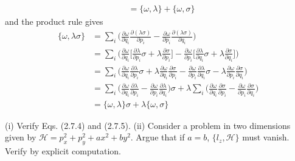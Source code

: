 \documentclass[../principles-of-quantum-mechanics.tex]{subfiles}
\begin{document}
\begin{questions}
\begin{solution}
\begin{align*}
				&= \{\omega, \lambda\} + \{\omega, \sigma\}
			\end{align*}
			and the product rule gives
			\begin{align*}
				\{\omega, \lambda\sigma\} &= \sum_i\Big(\frac{\partial\omega}{\partial q_i}\frac{\partial(\lambda\sigma)}{\partial p_i} - \frac{\partial\omega}{\partial p_i}\frac{\partial(\lambda\sigma)}{\partial q_i}\Big) \\
				&= \sum_i\Big(\frac{\partial\omega}{\partial q_i}\Big[\frac{\partial\lambda}{\partial p_i}\sigma + \lambda\frac{\partial\sigma}{\partial p_i}\Big] - \frac{\partial\omega}{\partial p_i}\Big[\frac{\partial\lambda}{\partial q_i}\sigma + \lambda\frac{\partial\sigma}{\partial q_i}\Big]\Big) \\
				&= \sum_i\Big(\frac{\partial\omega}{\partial q_i}\frac{\partial\lambda}{\partial p_i}\sigma + \lambda\frac{\partial\omega}{\partial q_i}\frac{\partial\sigma}{\partial p_i} - \frac{\partial\omega}{\partial p_i}\frac{\partial\lambda}{\partial q_i}\sigma - \lambda\frac{\partial\omega}{\partial p_i}\frac{\partial\sigma}{\partial q_i}\Big) \\
				&= \sum_i\Big(\frac{\partial\omega}{\partial q_i}\frac{\partial\lambda}{\partial p_i} - \frac{\partial\omega}{\partial p_i}\frac{\partial\lambda}{\partial q_i}\Big)\sigma + \lambda\sum_i\Big(\frac{\partial\omega}{\partial q_i}\frac{\partial\sigma}{\partial p_i} - \frac{\partial\omega}{\partial p_i}\frac{\partial\sigma}{\partial q_i}\Big) \\
				&= \{\omega, \lambda\}\sigma + \lambda\{\omega, \sigma\}
			\end{align*}
		\end{solution}
	
		\question (i) Verify Eqs. (2.7.4) and (2.7.5). (ii) Consider a problem in two dimensions given by $\mathcal{H} = p_x^2 + p_y^2 + ax^2 + by^2$. Argue that if $a=b$, $\{l_z, \mathcal{H}\}$ must vanish. Verify by explicit computation.
		

\end{questions}
\end{document}
